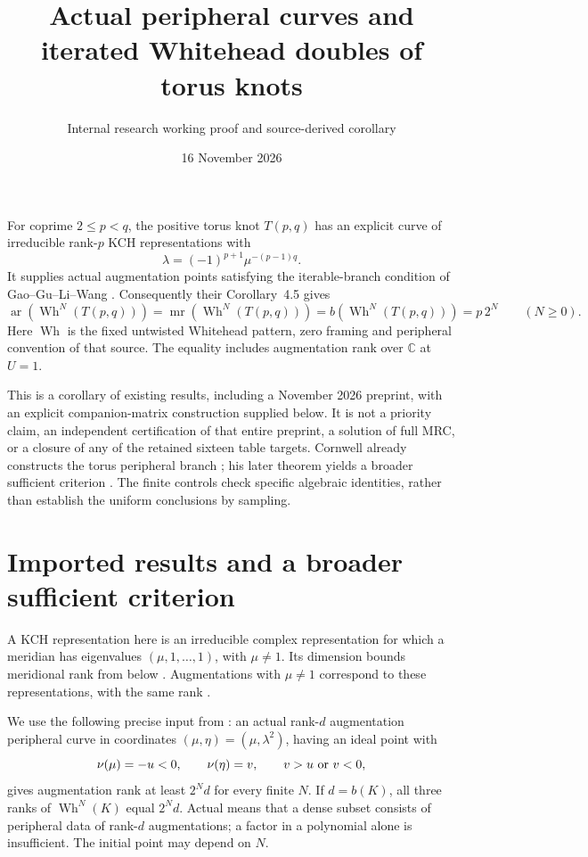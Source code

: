 \documentclass[11pt]{article}
\title{Actual peripheral curves and iterated Whitehead doubles of torus knots}
\author{Internal research working proof and source-derived corollary}
\date{16 November 2026}
\newcommand{\mr}{\operatorname{mr}}
\newcommand{\ar}{\operatorname{ar}}
\newcommand{\Wh}{\operatorname{Wh}}
\newcommand{\C}{\mathbb C}
\begin{document}
\maketitle

For coprime $2\le p<q$, the positive torus knot $T(p,q)$ has an
explicit curve of irreducible rank-$p$ KCH representations with
\[
 \lambda=(-1)^{p+1}\mu^{-(p-1)q}.
\]
It supplies actual augmentation points satisfying the iterable-branch
condition of Gao--Gu--Li--Wang \cite{gglw}. Consequently their
Corollary~4.5 gives
\begin{equation}\label{eq:sharp}
 \ar(\Wh^N(T(p,q)))=\mr(\Wh^N(T(p,q)))
 =b(\Wh^N(T(p,q)))=p\,2^N \qquad(N\ge0).
\end{equation}
Here $\Wh$ is the fixed untwisted Whitehead pattern, zero framing and
peripheral convention of that source. The equality includes
augmentation rank over $\C$ at $U=1$.

This is a corollary of existing results, including a November 2026
preprint, with an explicit companion-matrix construction supplied
below. It is not a priority claim, an independent certification of
that entire preprint, a solution of full MRC, or a closure of any of
the retained sixteen table targets. Cornwell already constructs the
torus peripheral branch \cite{cor14}; his later theorem yields a
broader sufficient criterion \cite{cor17}. The finite controls check
specific algebraic identities, rather than establish the uniform
conclusions by sampling.

\section{Imported results and a broader sufficient criterion}

A KCH representation here is an irreducible complex representation
for which a meridian has eigenvalues $(\mu,1,\ldots,1)$, with
$\mu\ne1$. Its dimension bounds meridional rank from below
\cite[Theorem~1.1]{cor14}. Augmentations with $\mu\ne1$ correspond to
these representations, with the same rank \cite[Theorem~1.2]{cor17}.

We use the following precise input from \cite[Definition~4.1,
Corollary~4.5]{gglw}: an actual rank-$d$ augmentation peripheral curve
in coordinates $(\mu,\eta)=(\mu,\lambda^2)$, having an ideal point
with
\[
 \nu(\mu)=-u<0,\qquad \nu(\eta)=v,
 \qquad v>u\ \hbox{or}\ v<0,
\]
gives augmentation rank at least $2^Nd$ for every finite $N$.
If $d=b(K)$, all three ranks of $\Wh^N(K)$ equal $2^Nd$.
Actual means that a dense subset consists of peripheral data of
rank-$d$ augmentations; a factor in a polynomial alone is insufficient.
The initial point may depend on $N$.
\end{document}
